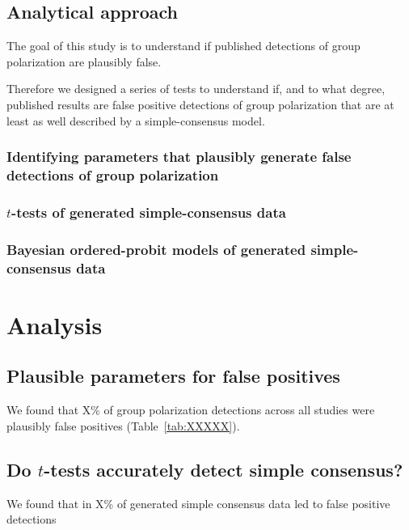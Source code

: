 \documentclass[12pt, letterpaper]{article}
\begin{document}
\subsection{Analytical approach}

The goal of this study is to understand if published detections of group polarization are
plausibly false. 

Therefore we designed a series of tests to understand if, and to what degree,
published results are false positive detections of group polarization that
are at least as well described by a simple-consensus model.



\subsubsection{Identifying parameters that plausibly generate false detections of group polarization}

\subsubsection{$t$-tests of generated simple-consensus data}

\subsubsection{Bayesian ordered-probit models of generated simple-consensus data}

\section{Analysis}

\subsection{Plausible parameters for false positives}

We found that X\% of group polarization detections across all studies were 
plausibly false positives (Table~\ref{tab:XXXXX}).



\subsection{Do $t$-tests accurately detect simple consensus?}

We found that in X\% of generated simple consensus data led to false positive
detections 
\end{document}
